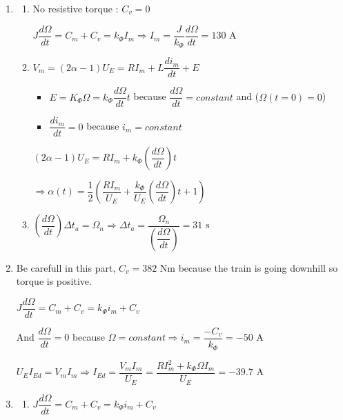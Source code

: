 \begin{enumerate}
\begin{enumerate}
        (1.1) $\Rightarrow V_m = - R \dfrac{C_v}{k_\Phi} \Rightarrow \alpha_{10} = \left(1 + \dfrac{- C_v R}{k_\Phi U_E} \right) \dfrac{1}{2} \approx 0.503$

        $I_{E0} = (2\alpha_{10} - 1) I_m = (2 \alpha_{10} - 1) \dfrac{-C_v}{k_\Phi} = \dfrac{R C_v^2}{k_\Phi^2 U_E} \approx 0.33 \text{ A}$
        
        \item 
        \begin{enumerate}
            \item No resistive torque : $C_v = 0$
        
            $J \dfrac{d\Omega}{dt} = C_m + C_v = k_\Phi I_m \Rightarrow I_m = \dfrac{J}{k_\Phi} \dfrac{d\Omega}{dt} = 130 \text{ A}$

        
            \item $V_m = (2\alpha -1) U_E = R I_m + L \dfrac{di_m}{dt} + E$
            \begin{itemize}
                \item $E = K_\Phi \Omega = k_\Phi \dfrac{d\Omega}{dt} t$ because $\dfrac{d\Omega}{dt} = constant$ and ($\Omega (t=0)=0$)
                \item $\dfrac{di_m}{dt} = 0$ because $i_m = constant$ 
            \end{itemize}
            $(2\alpha -1) U_E = R I_m + k_\Phi \left(\dfrac{d\Omega}{dt}\right) t$

            $\Rightarrow \alpha (t) = \dfrac{1}{2}\left(\dfrac{R I_m}{U_E} + \dfrac{k_\Phi}{U_E} \left(\dfrac{d\Omega}{dt}\right) t + 1\right)$

            \item $\left(\dfrac{d\Omega}{dt}\right) \Delta t_a = \Omega_n \Rightarrow \Delta t_a = \dfrac{\Omega_n}{\left(\dfrac{d\Omega}{dt}\right)} = 31 \text{ s}$
        \end{enumerate}
        \item Be carefull in this part, $C_v = 382 \text{ Nm}$ because the train is going downhill so torque is positive.
        
        $J \dfrac{d\Omega}{dt} = C_m + C_v = k_\Phi i_m + C_v$

        And $\dfrac{d\Omega}{dt} = 0$ because $\Omega = constant \Rightarrow i_m = \dfrac{-C_v}{k_\Phi} = -50 \text{ A}$

        $U_E I_{Ed} = V_m I_m \Rightarrow I_{Ed}= \dfrac{V_m I_m}{U_E} = \dfrac{R I_m^2 + k_\Phi \Omega I_m}{U_E} = -39.7 \text{ A}$

        \item \begin{enumerate}
            \item $J \dfrac{d\Omega}{dt} = C_m + C_v = k_\Phi i_m + C_v$
            

\end{enumerate}
\end{enumerate}
\end{enumerate}
